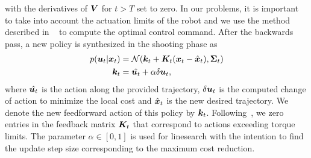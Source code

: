 with the derivatives of $\bm{V}$ for $t > T$ set to zero. In our problems, it is important to take into account the actuation
limits of the robot and we use the method described in ~\cite{tassa2014control} to compute the optimal control command.
%
%
%
After the backwards pass, a new policy is synthesized in the shooting phase as
%
\begin{align}
  \label{eq:ilqr_policy}
  p(\bm{u}_{t}|\bm{x}_{t}) &= \mathcal{N}(\bm{k}_t + \bm{K}_t (\bm{x}_{t} - \hat{\bm{x}}_t), \bm{\Sigma}_t)\\
  \bm{k}_t &= \hat{\bm{u}_{t}} + \alpha \delta \bm{u}_{t},
\end{align}
%
where $\hat{\bm{u}_{t}}$ is the action along the provided trajectory, $\delta \bm{u}_{t}$ is the computed change of action to minimize the local cost and $\hat{\bm{x}}_t$ is the new desired trajectory. We denote the new feedforward action of this policy by $\bm{k}_t$. Following~\cite{tassa2014control}, we zero entries in the feedback matrix $\bm{K}_t$ that correspond to actions exceeding torque limits. The parameter $\alpha \in [0, 1]$ is used for linesearch with the intention to find the update step size corresponding to the maximum cost reduction.
%
